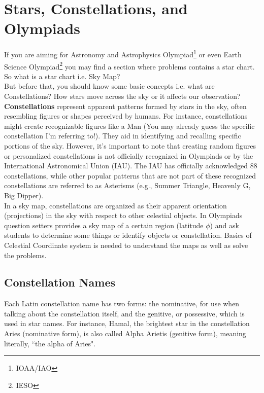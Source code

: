 \documentclass[a4paper,12pt]{extarticle}
\begin{document}
\section{Stars, Constellations, and Olympiads}
 
If you are aiming for Astronomy and Astrophysics Olympiad\footnote{IOAA/IAO} or even Earth Science Olympiad\footnote{IESO} you may find a section  where problems contains a star chart. So what is a star chart i.e. Sky Map?\\

But before that, you should know some basic concepts i.e. what are Constellations? How stars move across the sky or it affects our observation? \\

\textbf{Constellations} represent apparent patterns formed by stars in the sky, often resembling figures or shapes perceived by humans. For instance, constellations might create recognizable figures like a Man (You may already guess the specific constellation I'm referring to!). They aid in identifying and recalling specific portions of the sky. However, it's important to note that creating random figures or personalized constellations is not officially recognized in Olympiads or by the International Astronomical Union (IAU). The IAU has officially acknowledged 88 constellations, while other popular patterns that are not part of these recognized constellations are referred to as Asterisms (e.g., Summer Triangle, Heavenly G, Big Dipper).\\

In a sky map, constellations are organized as their apparent orientation (projections) in the sky with respect to other celestial objects. In Olympiads question setters provides a sky map of a certain region (latitude $\phi$) and ask students to determine some things or identify objects or constellation. Basics of Celestial Coordinate system is needed to understand the maps as well as solve the problems.

\subsection{Constellation Names}

Each Latin constellation name has two forms: the nominative, for use when talking about the constellation itself, and the genitive, or possessive, which is used in star names. For instance, Hamal, the brightest star in the constellation Aries (nominative form), is also called Alpha Arietis (genitive form), meaning literally, ``the alpha of Aries".\\
\end{document}
